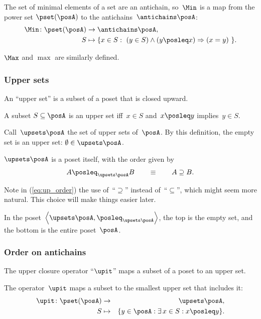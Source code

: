 The set of minimal elements of a set are an antichain, so~$\Min$
is a map from the power set $\pset(\posA)$ to the antichains~$\antichains\posA$:
\begin{align*}
\Min\colon\pset(\posA) & \rightarrow\antichains\posA,\\
S & \mapsto\{x\in S:\ (y\in S)\wedge(y\posleq x)\Rightarrow(x=y)\ \}.
\end{align*}

$\Max$ and $\max$ are similarly defined.

\subsubsection{Upper sets}

An ``upper set'' is a subset of a poset that is closed upward.

\begin{definition}
A subset $S\subseteq\posA$ is an upper set iff~$x\in S$ and~$x\posleq y$
implies~$y\in S$. 
\end{definition}
Call~$\upsets\posA$ the set of upper sets of~$\posA$. By this
definition, the empty set is an upper set: $\emptyset\in\upsets\posA$.
\begin{lemma}
$\upsets\posA$ is a poset itself, with the order given by 
\begin{equation}
A\posleq_{\upsets\posA}B\qquad\equiv\qquad A\supseteq B.\label{eq:up_order}
\end{equation}
\end{lemma}
Note in (\ref{eq:up_order}) the use of~``$\supseteq$'' instead
of~``$\subseteq$'', which might seem more natural. This choice
will make things easier later. 

In the poset~$\left\langle \upsets\posA,\posleq_{\upsets\posA}\right\rangle $,
the top is the empty set, and the bottom is the entire poset~$\posA$.


\subsubsection{Order on antichains}

The upper closure operator ``$\upit$'' maps a subset of a poset
to an upper set.
\begin{definition}
The operator~$\upit$ maps a subset to the smallest upper set that
includes it: 
\begin{eqnarray*}
\upit\colon\pset(\posA) & \rightarrow & \upsets\posA,\\
S & \mapsto & \{y\in\posA:\exists\,x\in S:x\posleq y\}.
\end{eqnarray*}
\end{definition}

